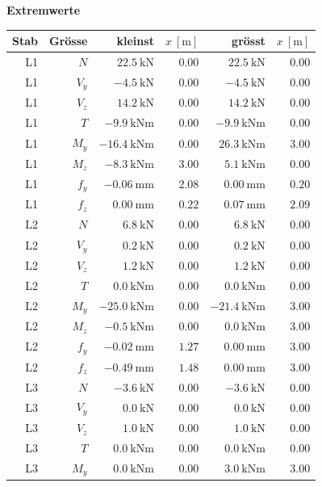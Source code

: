 \documentclass[11pt,a4paper]{article}
\begin{document}
\noindent\textbf{Extremwerte}
\begin{longtable}{rrrrrr}
\hline
Stab & Grösse & kleinst & $x\ [\mathrm{m}]$ & grösst & $x\ [\mathrm{m}]$ \\
\hline
\endhead
L1 & $N$ & $22.5\ \mathrm{kN}$ & $0.00$ & $22.5\ \mathrm{kN}$ & $0.00$ \\
L1 & $V_y$ & $-4.5\ \mathrm{kN}$ & $0.00$ & $-4.5\ \mathrm{kN}$ & $0.00$ \\
L1 & $V_z$ & $14.2\ \mathrm{kN}$ & $0.00$ & $14.2\ \mathrm{kN}$ & $0.00$ \\
L1 & $T$ & $-9.9\ \mathrm{kNm}$ & $0.00$ & $-9.9\ \mathrm{kNm}$ & $0.00$ \\
L1 & $M_y$ & $-16.4\ \mathrm{kNm}$ & $0.00$ & $26.3\ \mathrm{kNm}$ & $3.00$ \\
L1 & $M_z$ & $-8.3\ \mathrm{kNm}$ & $3.00$ & $5.1\ \mathrm{kNm}$ & $0.00$ \\
L1 & $f_y$ & $-0.06\ \mathrm{mm}$ & $2.08$ & $0.00\ \mathrm{mm}$ & $0.20$ \\
L1 & $f_z$ & $0.00\ \mathrm{mm}$ & $0.22$ & $0.07\ \mathrm{mm}$ & $2.09$ \\
L2 & $N$ & $6.8\ \mathrm{kN}$ & $0.00$ & $6.8\ \mathrm{kN}$ & $0.00$ \\
L2 & $V_y$ & $0.2\ \mathrm{kN}$ & $0.00$ & $0.2\ \mathrm{kN}$ & $0.00$ \\
L2 & $V_z$ & $1.2\ \mathrm{kN}$ & $0.00$ & $1.2\ \mathrm{kN}$ & $0.00$ \\
L2 & $T$ & $0.0\ \mathrm{kNm}$ & $0.00$ & $0.0\ \mathrm{kNm}$ & $0.00$ \\
L2 & $M_y$ & $-25.0\ \mathrm{kNm}$ & $0.00$ & $-21.4\ \mathrm{kNm}$ & $3.00$ \\
L2 & $M_z$ & $-0.5\ \mathrm{kNm}$ & $0.00$ & $0.0\ \mathrm{kNm}$ & $3.00$ \\
L2 & $f_y$ & $-0.02\ \mathrm{mm}$ & $1.27$ & $0.00\ \mathrm{mm}$ & $3.00$ \\
L2 & $f_z$ & $-0.49\ \mathrm{mm}$ & $1.48$ & $0.00\ \mathrm{mm}$ & $3.00$ \\
L3 & $N$ & $-3.6\ \mathrm{kN}$ & $0.00$ & $-3.6\ \mathrm{kN}$ & $0.00$ \\
L3 & $V_y$ & $0.0\ \mathrm{kN}$ & $0.00$ & $0.0\ \mathrm{kN}$ & $0.00$ \\
L3 & $V_z$ & $1.0\ \mathrm{kN}$ & $0.00$ & $1.0\ \mathrm{kN}$ & $0.00$ \\
L3 & $T$ & $0.0\ \mathrm{kNm}$ & $0.00$ & $0.0\ \mathrm{kNm}$ & $0.00$ \\
L3 & $M_y$ & $0.0\ \mathrm{kNm}$ & $0.00$ & $3.0\ \mathrm{kNm}$ & $3.00$ \\

\end{longtable}
\end{document}
